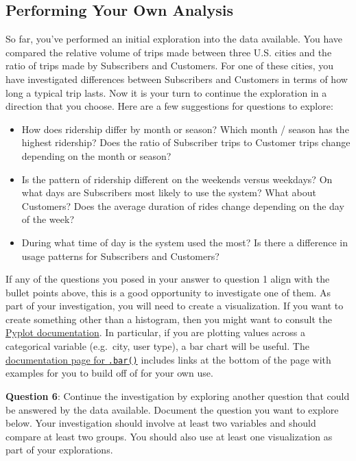 \documentclass[11pt]{article}
\providecommand{\tightlist}{%
      \setlength{\itemsep}{0pt}\setlength{\parskip}{0pt}}
\begin{document}
\hypertarget{performing-your-own-analysis}{%
\subsection{Performing Your Own
Analysis}\label{performing-your-own-analysis}}

So far, you've performed an initial exploration into the data available.
You have compared the relative volume of trips made between three U.S.
cities and the ratio of trips made by Subscribers and Customers. For one
of these cities, you have investigated differences between Subscribers
and Customers in terms of how long a typical trip lasts. Now it is your
turn to continue the exploration in a direction that you choose. Here
are a few suggestions for questions to explore:

\begin{itemize}
\tightlist
\item
  How does ridership differ by month or season? Which month / season has
  the highest ridership? Does the ratio of Subscriber trips to Customer
  trips change depending on the month or season?
\item
  Is the pattern of ridership different on the weekends versus weekdays?
  On what days are Subscribers most likely to use the system? What about
  Customers? Does the average duration of rides change depending on the
  day of the week?
\item
  During what time of day is the system used the most? Is there a
  difference in usage patterns for Subscribers and Customers?
\end{itemize}

If any of the questions you posed in your answer to question 1 align
with the bullet points above, this is a good opportunity to investigate
one of them. As part of your investigation, you will need to create a
visualization. If you want to create something other than a histogram,
then you might want to consult the
\href{https://matplotlib.org/devdocs/api/pyplot_summary.html}{Pyplot
documentation}. In particular, if you are plotting values across a
categorical variable (e.g.~city, user type), a bar chart will be useful.
The
\href{https://matplotlib.org/devdocs/api/_as_gen/matplotlib.pyplot.bar.html\#matplotlib.pyplot.bar}{documentation
page for \texttt{.bar()}} includes links at the bottom of the page with
examples for you to build off of for your own use.

\textbf{Question 6}: Continue the investigation by exploring another
question that could be answered by the data available. Document the
question you want to explore below. Your investigation should involve at
least two variables and should compare at least two groups. You should
also use at least one visualization as part of your explorations.
\end{document}
